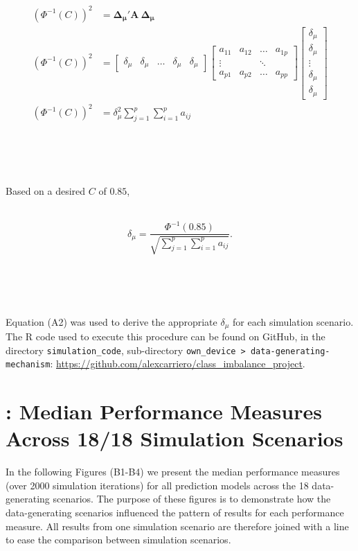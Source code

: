 \documentclass[AMA,STIX1COL,]{WileyNJD-v2}
\begin{document}
\begin{align*}
(\Phi^{-1}(C))^2 &= \pmb{\Delta_\mu{'}}  \pmb{A} \  \pmb{\Delta_{\mu}}\\
(\Phi^{-1}(C))^2 &= 
\begin{bmatrix}
 \delta_\mu & \delta_\mu &   \dots &  \delta_\mu &  \delta_\mu
\end{bmatrix} \begin{bmatrix} 
    a_{11} & a_{12}  & \dots  & a_{1p}\\
    \vdots &         & \ddots & \\
    a_{p1} &  a_{p2} & \dots  & a_{pp} 
\end{bmatrix}\begin{bmatrix}
 \delta_\mu \\ \delta_\mu \\ \vdots \\ \delta_\mu \\ \delta_\mu
\end{bmatrix}\\
(\Phi^{-1}(C))^2 &= \delta_{\mu}^2 \sum_{j = 1}^{p} \sum_{i = 1}^{p} a_{ij}
\end{align*}\\
\strut \\
\strut \\
Based on a desired \(C\) of \(0.85\),\\
\strut \\
\begin{equation} \tag{A2}
\delta_\mu = \frac{\Phi^{-1}(0.85)}{\sqrt{\sum_{j = 1}^{p} \sum_{i = 1}^{p} a_{ij}}}.
\end{equation}\\
\strut \\
\strut \\
Equation (A2) was used to derive the appropriate \(\delta_\mu\) for each
simulation scenario. The R code used to execute this procedure can be
found on GitHub, in the directory \texttt{simulation\_code},
sub-directory
\texttt{own\_device\ \textgreater{}\ data-generating-mechanism}:
\url{https://github.com/alexcarriero/class_imbalance_project}.

\newpage

\section{:  Median Performance Measures Across 18/18 Simulation Scenarios}

In the following Figures (B1-B4) we present the median performance
measures (over 2000 simulation iterations) for all prediction models
across the 18 data-generating scenarios. The purpose of these figures is
to demonstrate how the data-generating scenarios influenced the pattern
of results for each performance measure. All results from one simulation
scenario are therefore joined with a line to ease the comparison between
simulation scenarios.
\end{document}
